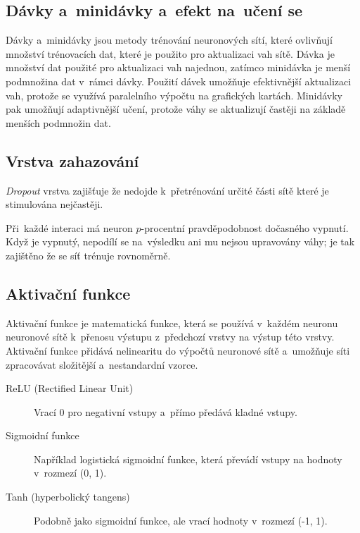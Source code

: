 \subsection{Dávky a~minidávky a~efekt na~učení se}

Dávky a~minidávky jsou metody trénování neuronových sítí, které ovlivňují množství trénovacích dat, které je použito pro aktualizaci vah sítě. Dávka je množství dat použité pro aktualizaci vah najednou, zatímco minidávka je menší podmnožina dat v~rámci dávky. Použití dávek umožňuje efektivnější aktualizaci vah, protože se využívá paralelního výpočtu na grafických kartách. Minidávky pak umožňují adaptivnější učení, protože váhy se aktualizují častěji na základě menších podmnožin dat.


\subsection{Vrstva zahazování}

\emph{Dropout} vrstva zajišťuje že nedojde k~přetrénování určité části sítě které je stimulována nejčastěji.

Při~každé interaci má neuron $p$-procentní pravděpodobnost dočasného vypnutí.
Když je vypnutý, nepodílí se na~výsledku ani mu nejsou upravovány váhy; je tak zajištěno že se síť trénuje rovnoměrně.

\subsection{Aktivační funkce}

Aktivační funkce je matematická funkce, která se používá v~každém neuronu neuronové sítě k~přenosu výstupu z~předchozí vrstvy na výstup této vrstvy. Aktivační funkce přidává nelinearitu do výpočtů neuronové sítě a~umožňuje síti zpracovávat složitější a~nestandardní vzorce.

\begin{description}
    \item[ReLU (Rectified Linear Unit)] Vrací 0 pro negativní vstupy a~přímo předává kladné vstupy.
    \item[Sigmoidní funkce] Například logistická sigmoidní funkce, která převádí vstupy na hodnoty v~rozmezí (0, 1).
    \item[Tanh (hyperbolický tangens)] Podobně jako sigmoidní funkce, ale vrací hodnoty v~rozmezí (-1, 1).
\end{description}

